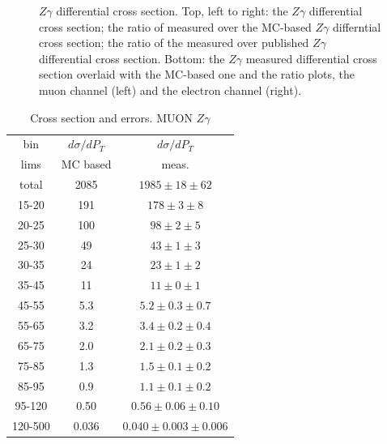\begin{figure}[htb]
\begin{center}
  \caption{$Z\gamma$ differential cross section. Top, left to right: the $Z\gamma$ differential cross section; the ratio of measured over the MC-based $Z\gamma$ differntial cross section; the ratio of the measured over published $Z\gamma$ differential cross section. Bottom:  the $Z\gamma$ measured differential cross section overlaid with the MC-based one and the ratio plots, the muon channel (left) and the electron channel (right).}
  \label{fig:CS_Zg}
 \end{center}
\end{figure}
  

\begin{table}[h]
  \scriptsize
  \begin{center}
  \caption{Cross section and errors. MUON $Z\gamma$}
  \begin{tabular}{|c|c|c|}
    bin & $d\sigma/dP_{T}$ &$d\sigma/dP_{T}$ \\ 
    lims & MC based &    meas.       \\ \hline
    total & 2085 & $1985 \pm 18 \pm 62$ \\ \hline
    15-20 & 191 & $178 \pm 3 \pm 8$ \\ \hline
    20-25 & 100 & $98 \pm 2 \pm 5$ \\ \hline
    25-30 & 49 & $43 \pm 1 \pm 3$ \\ \hline
    30-35 & 24 & $23 \pm 1 \pm 2$ \\ \hline
    35-45 & 11 & $11 \pm 0 \pm 1$ \\ \hline
    45-55 & 5.3 & $5.2 \pm 0.3 \pm 0.7$ \\ \hline
    55-65 & 3.2 & $3.4 \pm 0.2 \pm 0.4$ \\ \hline
    65-75 & 2.0 & $2.1 \pm 0.2 \pm 0.3$ \\ \hline
    75-85 & 1.3 & $1.5 \pm 0.1 \pm 0.2$ \\ \hline
    85-95 & 0.9 & $1.1 \pm 0.1 \pm 0.2$ \\ \hline
    95-120 & 0.50 & $0.56 \pm 0.06 \pm 0.10$ \\ \hline
    120-500 & 0.036 & $0.040 \pm 0.003 \pm 0.006$ \\ \hline
  \end{tabular}
  \label{tab:sc_mc_vs_meas_MUON_ZGamma}
  \end{center}
\end{table}

